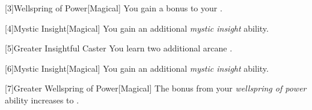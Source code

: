         [3]{Wellspring of Power}[Magical]
        You gain a  bonus to your  .

        [4]{Mystic Insight}[Magical]
        You gain an additional \textit{mystic insight} ability.

        [5]{Greater Insightful Caster} You learn two additional arcane .

        [6]{Mystic Insight}[Magical]
        You gain an additional \textit{mystic insight} ability.

        [7]{Greater Wellspring of Power}[Magical]
        The bonus from your \textit{wellspring of power} ability increases to .

